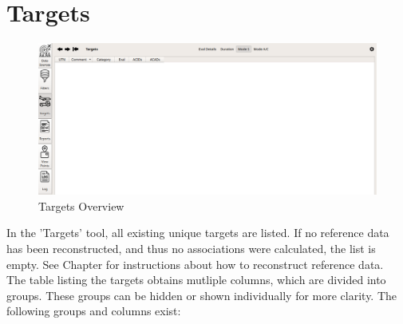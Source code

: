 
\section{Targets}
\label{sec:targets}

\begin{figure}[H]
    \hspace*{-2.5cm}
    \includegraphics[width=19cm,frame]{figures/ui_targets.png}
  \caption{Targets Overview}
\end{figure}

In the 'Targets' tool, all existing unique targets are listed. If no reference data has been reconstructed, and thus no associations were calculated, the list is empty. 
See Chapter  for instructions about how to reconstruct reference data. \\

The table listing the targets obtains mutliple columns, which are divided into groups.
These groups can be hidden or shown individually for more clarity. The following groups and columns exist:

